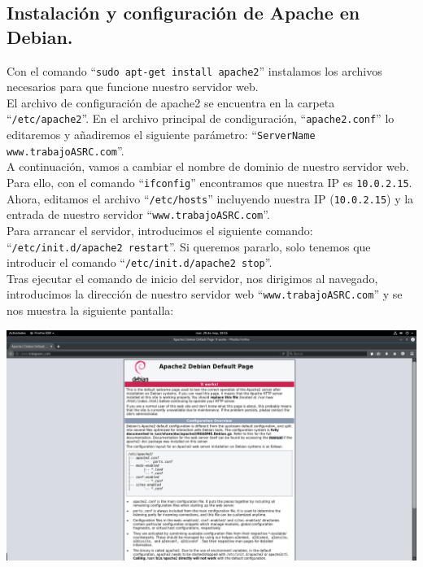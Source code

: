 \documentclass[12pt,letterpaper]{article}
\begin{document}
\subsection{Instalación y configuración de Apache en Debian.}
Con el comando ``\texttt{sudo apt-get install apache2}'' instalamos los archivos necesarios para que funcione nuestro servidor web.\\

El archivo de configuración de apache2 se encuentra en la carpeta ``\texttt{/etc/apache2}''. En el archivo principal de condiguración, ``\texttt{apache2.conf}'' lo editaremos y añadiremos el siguiente parámetro: ``\texttt{ServerName www.trabajoASRC.com}''.\\

A continuación, vamos a cambiar el nombre de dominio de nuestro servidor web. Para ello, con el comando ``\texttt{ifconfig}'' encontramos que nuestra IP es \texttt{10.0.2.15}. Ahora, editamos el archivo ``\texttt{/etc/hosts}'' incluyendo nuestra IP (\texttt{10.0.2.15}) y la entrada de nuestro servidor ``\texttt{www.trabajoASRC.com}''.\\

Para arrancar el servidor, introducimos el siguiente comando: ``\texttt{/etc/init.d/apache2 restart}''. Si queremos pararlo, solo tenemos que introducir el comando ``\texttt{/etc/init.d/apache2 stop}''.\\

Tras ejecutar el comando de inicio del servidor, nos dirigimos al navegado, introducimos la dirección de nuestro servidor web ``\texttt{www.trabajoASRC.com}'' y se nos muestra la siguiente pantalla:
\newpage
\begin{center}
	\includegraphics[scale=0.24]{apache.png}
\end{center}
\end{document}

